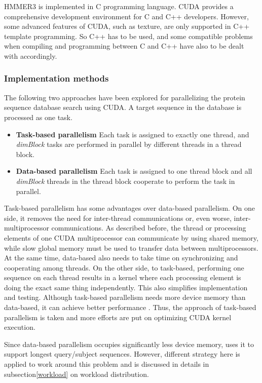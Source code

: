 HMMER3 is implemented in C programming language. CUDA provides a comprehensive development environment for C and C++ developers. However, some advanced features of CUDA, such as texture, are only supported in C++ template programming. So C++ has to be used, and some compatible problems when compiling and programming between C and C++ have also to be dealt with accordingly.

\subsubsection*{Implementation methods}
\label{impl}

The following two approaches have been explored for parallelizing the protein sequence database search using CUDA. A target sequence in the database is processed as one task.

\begin{itemize}
 \item \textbf{Task-based parallelism} Each task is assigned to exactly one thread, and \emph{dimBlock} tasks are performed in parallel by different threads in a thread block.
 \item \textbf{Data-based parallelism} Each task is assigned to one thread block and all \emph{dimBlock} threads in the thread block cooperate to perform the task in parallel.
\end{itemize}

Task-based parallelism has some advantages over data-based parallelism. On one side, it removes the need for inter-thread communications or, even worse, inter-multiprocessor communications. As described before, the thread or processing elements of one CUDA multiprocessor can communicate by using shared memory, while slow global memory must be used to transfer data between multiprocessors. At the same time, data-based also needs to take time on synchronizing and cooperating among threads. On the other side, to task-based, performing one sequence on each thread results in a kernel where each processing element is doing the exact same thing independently. This also simplifies implementation and testing. Although task-based parallelism needs more device memory than data-based, it can achieve better performance \citep{SW++}. Thus, the approach of task-based parallelism is taken and more efforts are put on optimizing CUDA kernel execution.

Since data-based parallelism occupies significantly less device memory, \citep{SW++} uses it to support longest query/subject sequences. However, different strategy here is applied to work around this problem and is discussed in details in subsection\ref{workload} on workload distribution.

